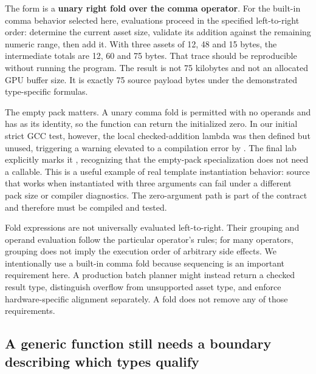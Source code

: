 The  form is a \textbf{unary right fold over the comma operator}. For the built-in comma behavior selected here, evaluations proceed in the specified left-to-right order: determine the current asset size, validate its addition against the remaining numeric range, then add it. With three assets of 12, 48 and 15 bytes, the intermediate totals are 12, 60 and 75 bytes. That trace should be reproducible without running the program. The result is not 75 kilobytes and not an allocated GPU buffer size. It is exactly 75 source payload bytes under the demonstrated type-specific formulas.

The empty pack matters. A unary comma fold is permitted with no operands and has  as its identity, so the function can return the initialized zero. In our initial strict GCC test, however, the local checked-addition lambda was then defined but unused, triggering a warning elevated to a compilation error by . The final lab explicitly marks it , recognizing that the empty-pack specialization does not need a callable. This is a useful example of real template instantiation behavior: source that works when instantiated with three arguments can fail under a different pack size or compiler diagnostics. The zero-argument path is part of the contract and therefore must be compiled and tested.

Fold expressions are not universally evaluated left-to-right. Their grouping and operand evaluation follow the particular operator's rules; for many operators, grouping does not imply the execution order of arbitrary side effects. We intentionally use a built-in comma fold because sequencing is an important requirement here. A production batch planner might instead return a checked result type, distinguish overflow from unsupported asset type, and enforce hardware-specific alignment separately. A fold does not remove any of those requirements.

\subsection{A generic function still needs a boundary describing which types qualify}\label{01-foundations-i-ch005-a-generic-function-still-needs-a-boundary-describing-which-types-qualify}

\hypertarget{01-foundations-i-ch005-a-generic-function-still-needs-a-boundary-describing-which-types-qualify}{}

